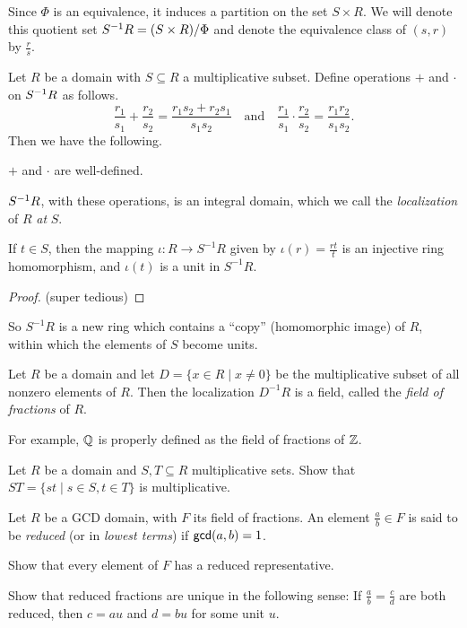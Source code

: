 Since \(\Phi\) is an equivalence, it induces a partition on the set \(S \times R\).
We will denote this quotient set \(\LOCALIZE{R}{S} = (S \times R)/\Phi\) and denote the equivalence class of \((s,r)\) by \(\frac{r}{s}\).

\begin{prop}
Let \(R\) be a domain with \(S \subseteq R\) a multiplicative subset.
Define operations \(+\) and \(\cdot\) on \(\LOCALIZE{R}{S}\) as follows.
\[ \frac{r_1}{s_1} + \frac{r_2}{s_2} = \frac{r_1s_2 + r_2s_1}{s_1s_2} \quad \mathrm{and} \quad \frac{r_1}{s_1} \cdot \frac{r_2}{s_2} = \frac{r_1r_2}{s_1s_2}. \]
Then we have the following.
\begin{proplist}
\item \(+\) and \(\cdot\) are well-defined.
\item \(\LOCALIZE{R}{S}\), with these operations, is an integral domain, which we call the \emph{localization} of \(R\) \emph{at} \(S\).
\item If \(t \in S\), then the mapping \(\iota : R \rightarrow S^{-1}R\) given by \(\iota(r) = \frac{rt}{t}\) is an injective ring homomorphism, and \(\iota(t)\) is a unit in \(S^{-1}R\).
\end{proplist}
\end{prop}

\begin{proof}
(super tedious)
\end{proof}

So \(S^{-1}R\) is a new ring which contains a ``copy'' (homomorphic image) of \(R\), within which the elements of \(S\) become units.

\begin{dfn}
Let \(R\) be a domain and let \(D = \{ x \in R \mid x \neq 0 \}\) be the multiplicative subset of all nonzero elements of \(R\).
Then the localization \(D^{-1}R\) is a field, called the \emph{field of fractions} of \(R\).
\end{dfn}

For example, \(\QQ\) is properly defined as the field of fractions of \(\ZZ\).



\Exercises%

\begin{exercise}
Let \(R\) be a domain and \(S,T \subseteq R\) multiplicative sets.
Show that \(ST = \{ st \mid s \in S, t \in T \}\) is multiplicative.
\end{exercise}


\begin{exercise}
Let \(R\) be a GCD domain, with \(F\) its field of fractions.
An element \(\frac{a}{b} \in F\) is said to be \emph{reduced} (or in \emph{lowest terms}) if \(\GCD{a}{b} = 1\).
\begin{proplist}
\item Show that every element of \(F\) has a reduced representative.
\item Show that reduced fractions are unique in the following sense: If \(\frac{a}{b} = \frac{c}{d}\) are both reduced, then \(c = au\) and \(d = bu\) for some unit \(u\).
\end{proplist}
\end{exercise}



